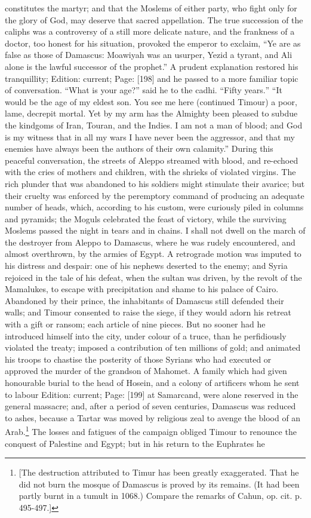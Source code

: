 constitutes the martyr; and that the Moslems of either party, who fight only for the glory of God, may deserve that sacred appellation. The true succession of the caliphs was a controversy of a still more delicate nature, and the frankness of a doctor, too honest for his situation, provoked the emperor to exclaim, \texthebrew{“}Ye are as false as those of Damascus: Moawiyah was an usurper, Yezid a tyrant, and Ali alone is the lawful successor of the prophet.\texthebrew{}” A prudent explanation restored his tranquillity; Edition: current; Page: [198] and he passed to a more familiar topic of conversation. \texthebrew{“}What is your age?\texthebrew{}” said he to the cadhi. \texthebrew{“}Fifty years.\texthebrew{” “}It would be the age of my eldest son. You see me here (continued Timour) a poor, lame, decrepit mortal. Yet by my arm has the Almighty been pleased to subdue the kindgoms of Iran, Touran, and the Indies. I am not a man of blood; and God is my witness that in all my wars I have never been the aggressor, and that my enemies have always been the authors of their own calamity.\texthebrew{}” During this peaceful conversation, the streets of Aleppo streamed with blood, and re-echoed with the cries of mothers and children, with the shrieks of violated virgins. The rich plunder that was abandoned to his soldiers might stimulate their avarice; but their cruelty was enforced by the peremptory command of producing an adequate number of heads, which, according to his custom, were curiously piled in columns and pyramids; the Moguls celebrated the feast of victory, while the surviving Moslems passed the night in tears and in chains. I shall not dwell on the march of the destroyer from Aleppo to Damascus, where he was rudely encountered, and almost overthrown, by the armies of Egypt. A retrograde motion was imputed to his distress and despair: one of his nephews deserted to the enemy; and Syria rejoiced in the tale of his defeat, when the sultan was driven, by the revolt of the Mamalukes, to escape with precipitation and shame to his palace of Cairo. Abandoned by their prince, the inhabitants of Damascus still defended their walls; and Timour consented to raise the siege, if they would adorn his retreat with a gift or ransom; each article of nine pieces. But no sooner had he introduced himself into the city, under colour of a truce, than he perfidiously violated the treaty; imposed a contribution of ten millions of gold; and animated his troops to chastise the posterity of those Syrians who had executed or approved the murder of the grandson of Mahomet. A family which had given honourable burial to the head of Hosein, and a colony of artificers whom he sent to labour Edition: current; Page: [199] at Samarcand, were alone reserved in the general massacre; and, after a period of seven centuries, Damascus was reduced to ashes, because a Tartar was moved by religious zeal to avenge the blood of an Arab.\footnote{[The destruction attributed to Timur has been greatly exaggerated. That he did not burn the mosque of Damascus is proved by its remains. (It had been partly burnt in a tumult in 1068.) Compare the remarks of Cahun, op. cit. p. 495-497.]} The losses and fatigues of the campaign obliged Timour to renounce the conquest of Palestine and Egypt; but in his return to the Euphrates he 